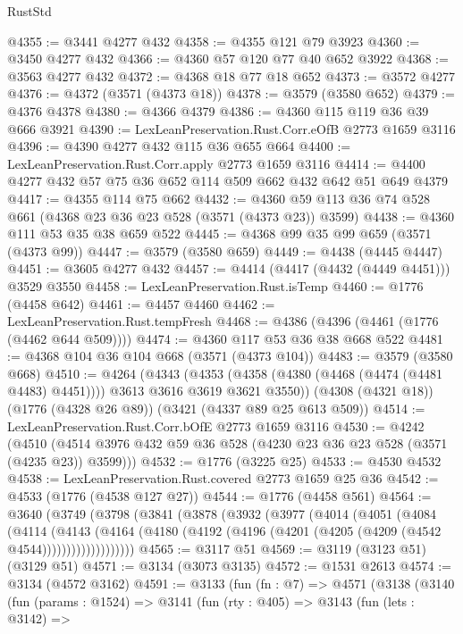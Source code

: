 \begin{lexlean}{RustStd}
\begin{coremodule}
@4355 := @3441 @4277 @432
@4358 := @4355 @121 @79 @3923
@4360 := @3450 @4277 @432
@4366 := @4360 @57 @120 @77 @40 @652 @3922
@4368 := @3563 @4277 @432
@4372 := @4368 @18 @77 @18 @652
@4373 := @3572 @4277
@4376 := @4372 (@3571 (@4373 @18))
@4378 := @3579 (@3580 @652)
@4379 := @4376 @4378
@4380 := @4366 @4379
@4386 := @4360 @115 @119 @36 @39 @666 @3921
@4390 := LexLeanPreservation.Rust.Corr.eOfB @2773 @1659 @3116
@4396 := @4390 @4277 @432 @115 @36 @655 @664
@4400 := LexLeanPreservation.Rust.Corr.apply @2773 @1659 @3116
@4414 := @4400 @4277 @432 @57 @75 @36 @652 @114 @509 @662 @432 @642 @51 @649 @4379
@4417 := @4355 @114 @75 @662
@4432 := @4360 @59 @113 @36 @74 @528 @661 (@4368 @23 @36 @23 @528 (@3571 (@4373 @23)) @3599)
@4438 := @4360 @111 @53 @35 @38 @659 @522
@4445 := @4368 @99 @35 @99 @659 (@3571 (@4373 @99))
@4447 := @3579 (@3580 @659)
@4449 := @4438 (@4445 @4447)
@4451 := @3605 @4277 @432
@4457 := @4414 (@4417 (@4432 (@4449 @4451))) @3529 @3550
@4458 := LexLeanPreservation.Rust.isTemp
@4460 := @1776 (@4458 @642)
@4461 := @4457 @4460
@4462 := LexLeanPreservation.Rust.tempFresh
@4468 := @4386 (@4396 (@4461 (@1776 (@4462 @644 @509))))
@4474 := @4360 @117 @53 @36 @38 @668 @522
@4481 := @4368 @104 @36 @104 @668 (@3571 (@4373 @104))
@4483 := @3579 (@3580 @668)
@4510 := @4264
    (@4343
      (@4353 (@4358 (@4380 (@4468 (@4474 (@4481 @4483) @4451)))) @3613 @3616 @3619 @3621 @3550))
    (@4308 (@4321 @18))
    (@1776 (@4328 @26 @89))
    (@3421 (@4337 @89 @25 @613 @509))
@4514 := LexLeanPreservation.Rust.Corr.bOfE @2773 @1659 @3116
@4530 := @4242
    (@4510 (@4514 @3976 @432 @59 @36 @528 (@4230 @23 @36 @23 @528 (@3571 (@4235 @23)) @3599)))
@4532 := @1776 (@3225 @25)
@4533 := @4530 @4532
@4538 := LexLeanPreservation.Rust.covered @2773 @1659 @25 @36
@4542 := @4533 (@1776 (@4538 @127 @27))
@4544 := @1776 (@4458 @561)
@4564 := @3640
    (@3749
      (@3798
        (@3841
          (@3878
            (@3932
              (@3977
                (@4014
                  (@4051
                    (@4084
                      (@4114
                        (@4143
                          (@4164
                            (@4180
                              (@4192 (@4196 (@4201 (@4205 (@4209 (@4542 @4544)))))))))))))))))))
@4565 := @3117 @51
@4569 := @3119 (@3123 @51) (@3129 @51)
@4571 := @3134 (@3073 @3135)
@4572 := @1531 @2613
@4574 := @3134 (@4572 @3162)
@4591 := @3133
    (fun (fn : @7) =>
    @4571
      (@3138
        (@3140
          (fun (params : @1524) =>
          @3141
            (fun (rty : @405) =>
            @3143
              (fun (lets : @3142) =>

\end{coremodule}
\end{lexlean}
